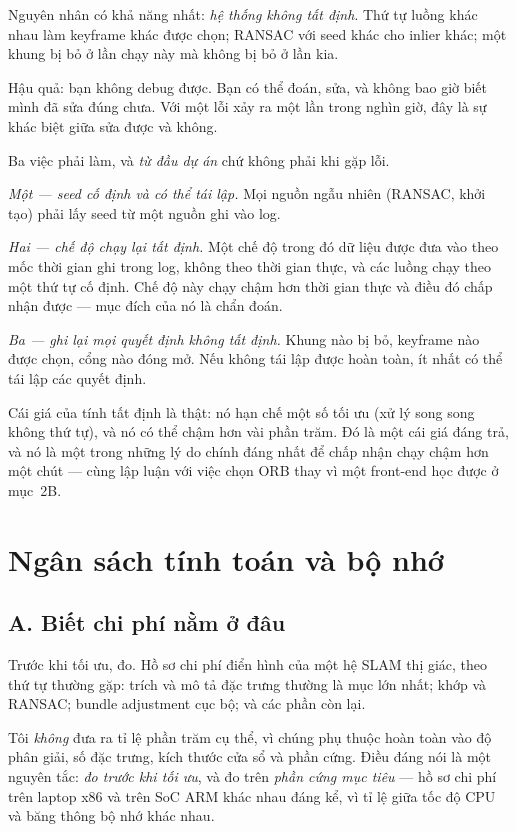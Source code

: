 \documentclass[../../vslam.tex]{subfiles}
\begin{document}
Nguyên nhân có khả năng nhất: \emph{hệ thống không tất định}. Thứ tự luồng khác nhau làm keyframe khác được chọn; RANSAC với seed khác cho inlier khác; một khung bị bỏ ở lần chạy này mà không bị bỏ ở lần kia.

Hậu quả: bạn không debug được. Bạn có thể đoán, sửa, và không bao giờ biết mình đã sửa đúng chưa. Với một lỗi xảy ra một lần trong nghìn giờ, đây là sự khác biệt giữa sửa được và không.

Ba việc phải làm, và \emph{từ đầu dự án} chứ không phải khi gặp lỗi.

\emph{Một --- seed cố định và có thể tái lập.} Mọi nguồn ngẫu nhiên (RANSAC, khởi tạo) phải lấy seed từ một nguồn ghi vào log.

\emph{Hai --- chế độ chạy lại tất định.} Một chế độ trong đó dữ liệu được đưa vào theo mốc thời gian ghi trong log, không theo thời gian thực, và các luồng chạy theo một thứ tự cố định. Chế độ này chạy chậm hơn thời gian thực và điều đó chấp nhận được --- mục đích của nó là chẩn đoán.

\emph{Ba --- ghi lại mọi quyết định không tất định.} Khung nào bị bỏ, keyframe nào được chọn, cổng nào đóng mở. Nếu không tái lập được hoàn toàn, ít nhất có thể tái lập các quyết định.

Cái giá của tính tất định là thật: nó hạn chế một số tối ưu (xử lý song song không thứ tự), và nó có thể chậm hơn vài phần trăm. Đó là một cái giá đáng trả, và nó là một trong những lý do chính đáng nhất để chấp nhận chạy chậm hơn một chút --- cùng lập luận với việc chọn ORB thay vì một front-end học được ở  mục~2B.

\section{Ngân sách tính toán và bộ nhớ}

\subsection{A. Biết chi phí nằm ở đâu}

Trước khi tối ưu, đo. Hồ sơ chi phí điển hình của một hệ SLAM thị giác, theo thứ tự thường gặp: trích và mô tả đặc trưng thường là mục lớn nhất; khớp và RANSAC; bundle adjustment cục bộ; và các phần còn lại.

Tôi \emph{không} đưa ra tỉ lệ phần trăm cụ thể, vì chúng phụ thuộc hoàn toàn vào độ phân giải, số đặc trưng, kích thước cửa sổ và phần cứng. Điều đáng nói là một nguyên tắc: \emph{đo trước khi tối ưu}, và đo trên \emph{phần cứng mục tiêu} --- hồ sơ chi phí trên laptop x86 và trên SoC ARM khác nhau đáng kể, vì tỉ lệ giữa tốc độ CPU và băng thông bộ nhớ khác nhau.
\end{document}
